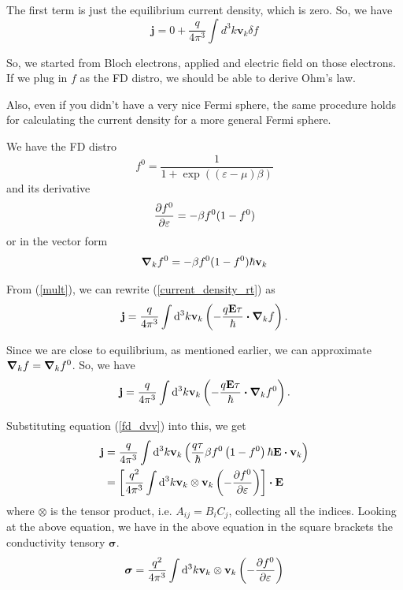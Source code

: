 \documentclass[a4paper]{article}
\newcommand{\hcut}{\hbar}
\begin{document}
The first term is just the equilibrium current density, which is zero.
So, we have
\begin{equation}
	\label{current_density_rt}
	\mathbf{j} = 0 + \frac{q}{4\pi ^3}\int d^3k \mathbf{v}_k \delta f
\end{equation}

So, we started from Bloch electrons, applied and electric field
on those electrons. If we plug in $f$ as the FD distro, we should
be able to derive Ohm's law.

Also, even if you didn't have a very nice Fermi sphere, the same
procedure holds for calculating the current density for a more
general Fermi sphere.

We have the FD distro
\begin{equation}
	f^{0} = \frac{1}{1 + \exp((\varepsilon - \mu)\beta)}
\end{equation}
and its derivative
\begin{equation}
	\label{fd_dv}
	\pdv{f^{0}}{\varepsilon} = -\beta f^{0}(1 - f^{0})
\end{equation}
or in the vector form
\begin{equation}
	\label{fd_dvv}
	\grad_k f^{0} = -\beta f^{0}(1 - f^{0})\hcut \mathbf{v}_k
\end{equation}

From (\ref{mult}), we can rewrite (\ref{current_density_rt}) as
\begin{equation}
	\mathbf{j} = \frac{q}{4\pi^3}\int \dd ^3 k \mathbf{v}_k \left( -\frac{q\textbf{E}\tau}{\hcut}\vdot\grad_k f \right).
\end{equation}

Since we are close to equilibrium, as mentioned earlier, we can approximate
$\grad_k f = \grad_k f^{0}$. So, we have
\begin{equation}
	\mathbf{j} = \frac{q}{4\pi^3} \int \dd ^3 k \mathbf{v}_k \left( -\frac{q\textbf{E}\tau}{\hcut}\vdot\grad_kf^{0} \right).
\end{equation}

Substituting  equation (\ref{fd_dvv}) into this, we get
\begin{equation}
	\begin{split}
		\mathbf{j} &= \frac{q}{4\pi^3}\int \dd ^3 k \mathbf{v}_k\left( \frac{q\tau}{\hcut}\beta f^{0}\left( 1 - f^{0} \right) \hcut \mathbf{E}\vdot \mathbf{v}_k \right) \\
			   & = \left[\frac{q^2}{4\pi^3}\int \dd ^3 k \mathbf{v}_k  \otimes \mathbf{v}_k\left( -\pdv{f^{0}}{\varepsilon} \right)\right]\vdot \mathbf{E}
	\end{split}
\end{equation}
where $\otimes$ is the tensor product, i.e.  $A_{ij} = B_iC_j$, collecting
all the indices. Looking at the above equation, we have in the above
equation in the square brackets the conductivity tensory  $\boldsymbol{\sigma}$. 
\begin{equation}
	\label{condtensor}
	\boldsymbol{\sigma} = \frac{q^2}{4\pi^3} \int \dd ^3 k \mathbf{v}_k \otimes \mathbf{v}_k \left( -\pdv{f^{0}}{\varepsilon} \right) 
\end{equation}
\end{document}
